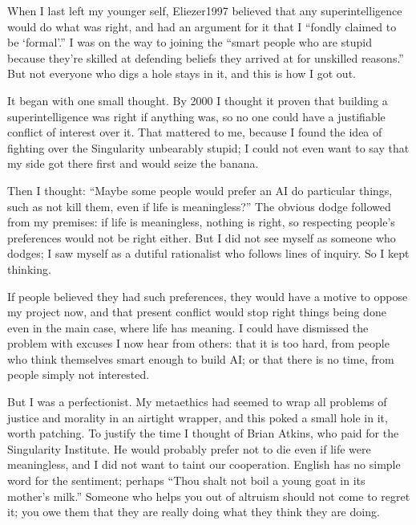 
When I last left my younger self, Eliezer1997 believed that any superintelligence would do what was right, and had an argument for it that I ``fondly claimed to be `formal'.''  I was on the way to joining the ``smart people who are stupid because they're skilled at defending beliefs they arrived at for unskilled reasons.''  But not everyone who digs a hole stays in it, and this is how I got out.

It began with one small thought. By 2000 I thought it proven that building a superintelligence was right if anything was, so no one could have a justifiable conflict of interest over it. That mattered to me, because I found the idea of fighting over the Singularity unbearably stupid; I could not even want to say that my side got there first and would seize the banana.

Then I thought: ``Maybe some people would prefer an AI do particular things, such as not kill them, even if life is meaningless?'' The obvious dodge followed from my premises: if life is meaningless, nothing is right, so respecting people's preferences would not be right either. But I did not see myself as someone who dodges; I saw myself as a dutiful rationalist who follows lines of inquiry. So I kept thinking.

If people believed they had such preferences, they would have a motive to oppose my project now, and that present conflict would stop right things being done even in the main case, where life has meaning. I could have dismissed the problem with excuses I now hear from others: that it is too hard, from people who think themselves smart enough to build AI; or that there is no time, from people simply not interested.

But I was a perfectionist. My metaethics had seemed to wrap all problems of justice and morality in an airtight wrapper, and this poked a small hole in it, worth patching. To justify the time I thought of Brian Atkins, who paid for the Singularity Institute. He would probably prefer not to die even if life were meaningless, and I did not want to taint our cooperation. English has no simple word for the sentiment; perhaps ``Thou shalt not boil a young goat in its mother's milk.'' Someone who helps you out of altruism should not come to regret it; you owe them that they are really doing what they think they are doing.


